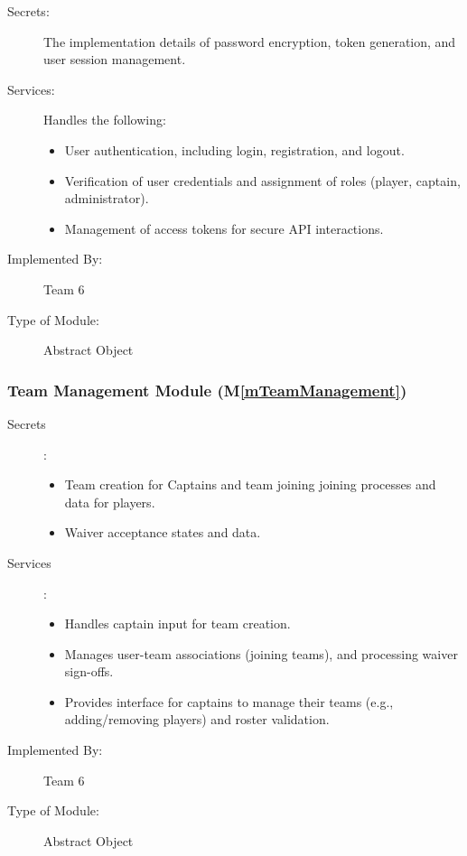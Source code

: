 \documentclass[12pt, titlepage]{article}
\newcommand{\mref}[1]{M\ref{#1}}
\begin{document}
\begin{description}
\item[Secrets:] The implementation details of password encryption, token generation, and user session management.

\item[Services:] Handles the following:
  \begin{itemize}
    \item User authentication, including login, registration, and logout.
    \item Verification of user credentials and assignment of roles (player, captain, administrator).
    \item Management of access tokens for secure API interactions.
  \end{itemize}

\item[Implemented By:] Team 6

\item[Type of Module:] Abstract Object
\end{description}

\subsubsection{Team Management Module (\mref{mTeamManagement})}

\begin{description}
\item[Secrets]: 
    \begin{itemize}
        \item Team creation for Captains and team joining joining processes and data for players.
        \item Waiver acceptance states and data.
    \end{itemize}
    
\item[Services]: 
    \begin{itemize}
        \item Handles captain input for team creation.
        \item Manages user-team associations (joining teams), and processing waiver sign-offs.
        \item Provides interface for captains to manage their teams (e.g., adding/removing players) and roster validation.
    \end{itemize}

\item[Implemented By:] Team 6
    
\item[Type of Module:] Abstract Object
\end{description}
\end{document}
